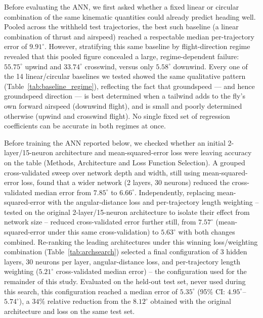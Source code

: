 \documentclass[11pt]{article}
\begin{document}
Before evaluating the ANN, we first asked whether a fixed linear or circular combination of the same kinematic quantities could already predict heading well. Pooled across the withheld test trajectories, the best such baseline (a linear combination of thrust and airspeed) reached a respectable median per-trajectory error of $9.91^\circ$. However, stratifying this same baseline by flight-direction regime revealed that this pooled figure concealed a large, regime-dependent failure: $55.75^\circ$ upwind and $33.74^\circ$ crosswind, versus only $5.58^\circ$ downwind. Every one of the 14 linear/circular baselines we tested showed the same qualitative pattern (Table~\ref{tab:baseline_regime}), reflecting the fact that groundspeed --- and hence groundspeed direction --- is best determined when a tailwind adds to the fly's own forward airspeed (downwind flight), and is small and poorly determined otherwise (upwind and crosswind flight). No single fixed set of regression coefficients can be accurate in both regimes at once.

Before training the ANN reported below, we checked whether an initial 2-layer/15-neuron architecture and mean-squared-error loss were leaving accuracy on the table (Methods, Architecture and Loss Function Selection). A grouped cross-validated sweep over network depth and width, still using mean-squared-error loss, found that a wider network (2 layers, 30 neurons) reduced the cross-validated median error from $7.85^\circ$ to $6.66^\circ$. Independently, replacing mean-squared-error with the angular-distance loss and per-trajectory length weighting -- tested on the original 2-layer/15-neuron architecture to isolate their effect from network size -- reduced cross-validated error further still, from $7.57^\circ$ (mean-squared-error under this same cross-validation) to $5.63^\circ$ with both changes combined. Re-ranking the leading architectures under this winning loss/weighting combination (Table~\ref{tab:archsearch}) selected a final configuration of 3 hidden layers, 30 neurons per layer, angular-distance loss, and per-trajectory length weighting ($5.21^\circ$ cross-validated median error) -- the configuration used for the remainder of this study. Evaluated on the held-out test set, never used during this search, this configuration reached a median error of $5.35^\circ$ (95\% CI: $4.95^\circ$--$5.74^\circ$), a $34\%$ relative reduction from the $8.12^\circ$ obtained with the original architecture and loss on the same test set.
\end{document}
